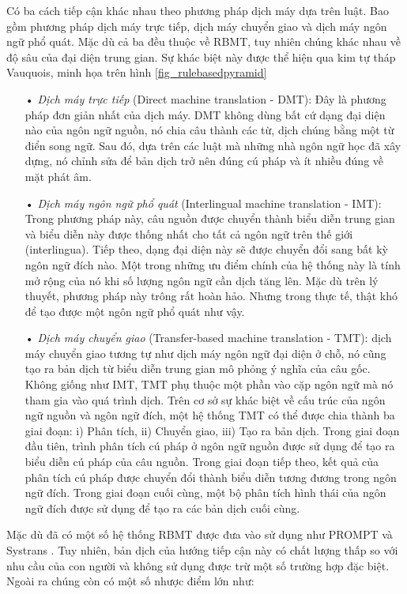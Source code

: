 Có ba cách tiếp cận khác nhau theo phương pháp dịch máy dựa trên luật. Bao gồm phương pháp dịch máy trực tiếp, dịch máy chuyển giao và dịch máy ngôn ngữ phổ quát. Mặc dù cả ba đều thuộc về RBMT, tuy nhiên chúng khác nhau về độ sâu của đại diện trung gian. Sự khác biệt này được thể hiện qua kim tự tháp Vauquois, minh họa trên hình \ref{fig_rulebasedpyramid} 
\begin{itemize}
	\item[•] \textit{Dịch máy trực tiếp} (Direct machine translation - DMT): Đây là phương pháp đơn giản nhất của dịch máy. DMT không dùng bất cứ dạng đại diện nào của ngôn ngữ nguồn, nó chia câu thành các từ, dịch chúng bằng một từ điển song ngữ. Sau đó, dựa trên các luật mà những nhà ngôn ngữ học đã xây dựng, nó chỉnh sửa để bản dịch trở nên đúng cú pháp và ít nhiều đúng về mặt phát âm.
	\item[•] \textit{Dịch máy ngôn ngữ phổ quát} (Interlingual machine translation - IMT): Trong phương pháp này, câu nguồn được chuyển thành biểu diễn trung gian và biểu diễn này được thống nhất cho tất cả ngôn ngữ trên thế giới (interlingua). Tiếp theo, dạng đại diện này sẽ được chuyển đổi sang bất kỳ ngôn ngữ đích nào. Một trong những ưu điểm chính của hệ thống này là tính mở rộng của nó khi số lượng ngôn ngữ cần dịch tăng lên. Mặc dù trên lý thuyết, phương pháp này trông rất hoàn hảo. Nhưng trong thực tế, thật khó để tạo được một ngôn ngữ phổ quát như vậy.
	\item[•] \textit{Dịch máy chuyển giao} (Transfer-based machine translation - TMT): dịch máy chuyển giao tương tự như dịch máy ngôn ngữ đại diện ở chỗ, nó cũng tạo ra bản dịch từ biểu diễn trung gian mô phỏng ý nghĩa của câu gốc. Không giống như IMT, TMT phụ thuộc một phần vào cặp ngôn ngữ mà nó tham gia vào quá trình dịch. Trên cơ sở sự khác biệt về cấu trúc của ngôn ngữ nguồn và ngôn ngữ đích, một hệ thống TMT có thể được chia thành ba giai đoạn: i) Phân tích, ii) Chuyển giao, iii) Tạo ra bản dịch. Trong giai đoạn đầu tiên, trình phân tích cú pháp ở ngôn ngữ nguồn được sử dụng để tạo ra biểu diễn cú pháp của câu nguồn. Trong giai đoạn tiếp theo, kết quả của phân tích cú pháp được chuyển đổi thành biểu diễn tương đương trong ngôn ngữ đích. Trong giai đoạn cuối cùng, một bộ phân tích hình thái của ngôn ngữ đích được sử dụng để tạo ra các bản dịch cuối cùng.
\end{itemize}
Mặc dù đã có một số hệ thống RBMT được đưa vào sử dụng như PROMPT \cite{promt} và Systrans \cite{systrans}. Tuy nhiên, bản dịch của hướng tiếp cận này có chất lượng thấp so với nhu cầu của con người và không sử dụng được trừ một số trường hợp đặc biệt. Ngoài ra chúng còn có một số nhược điểm lớn như:
